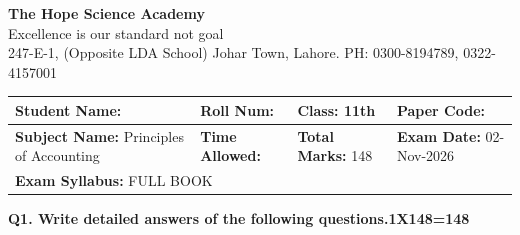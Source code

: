 \documentclass[11pt,a4paper]{article}
\begin{document}
\begin{center}
  {\Huge\bfseries The Hope Science Academy}\\[3pt]
  {\small Excellence is our standard not goal}\\[2pt]
  {\small 247-E-1, (Opposite LDA School) Johar Town, Lahore. PH: 0300-8194789, 0322-4157001}
\end{center}

\medskip
\noindent
\begin{tabularx}{\linewidth}{|X|X|X|X|}
\hline
\textbf{Student Name:} & \textbf{Roll Num:} & \textbf{Class:} 11th & \textbf{Paper Code:} \\ \hline
\textbf{Subject Name:} Principles of Accounting & \textbf{Time Allowed:} & \textbf{Total Marks:} 148 & \textbf{Exam Date:} 02-Nov-2026 \\ \hline
\multicolumn{4}{|l|}{\textbf{Exam Syllabus:} FULL BOOK} \\ \hline
\end{tabularx}

\bigskip
\noindent\textbf{Q1. Write detailed answers of the following questions.}\hfill\textbf{1X148=148}
\end{document}
